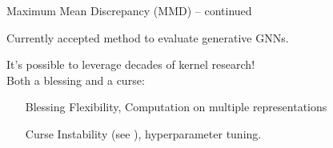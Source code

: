 \documentclass[aspectratio=169, 10pt, dvipsnames, handout]{beamer}
\begin{document}
\begin{frame}[fragile]{Maximum Mean Discrepancy (MMD) -- continued}
  \begin{minipage}{0.68\textwidth}
  \pause\small Currently accepted method to evaluate generative GNNs.
  \pause\begin{figure}
    \centering
  \end{figure}
    \pause\small It's possible to leverage decades of kernel research!\\
    \pause Both a
    \textcolor{PineGreen}{blessing} and a \textcolor{YellowOrange}{curse}:
    \begin{itemize}
      \pause\item[\textcolor{PineGreen}{Blessing}] Flexibility, Computation on
      multiple representations
      \pause\item[\textcolor{YellowOrange}{Curse}] Instability (see \citet{o2021evaluation}), hyperparameter tuning.
    \end{itemize}


\end{minipage}
\end{frame}
\end{document}

